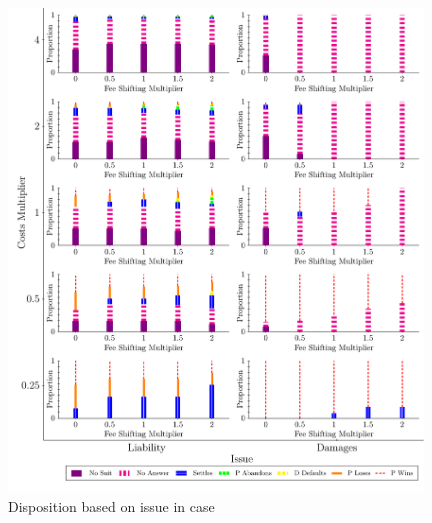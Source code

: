 \documentclass{article}
\begin{document}
\begin{figure}
    \centering
    \begin{minipage}{0.48\textwidth}
        \centering
        \includegraphics[width=0.98\textwidth, scale=0.70, trim={0in 0in 0in 0in}, clip]{../Figures/Disposition Varying Issue} %
        \caption{Disposition based on issue in case}
		\label{fig:dispositions_issue}
    \end{minipage}\hfill
    \begin{minipage}{0.48\textwidth}
        \centering

\end{minipage}
\end{figure}
\end{document}
